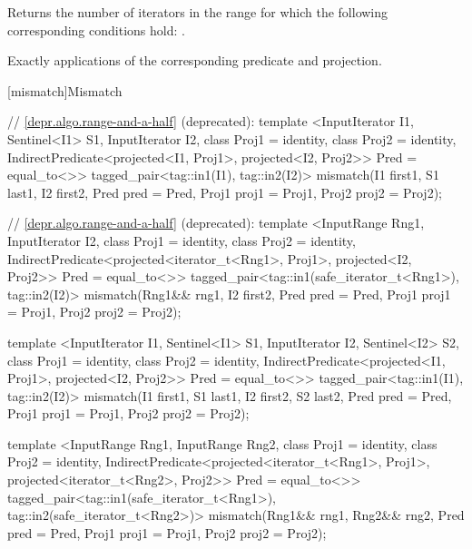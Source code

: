 \begin{itemdescr}
\pnum
\effects
Returns the number of iterators
in the range 
for which the following corresponding
conditions hold:
.

\pnum
\complexity
Exactly
applications of the corresponding predicate and projection.
\end{itemdescr}

[mismatch]{Mismatch}

%
\begin{itemdecl}
// \ref{depr.algo.range-and-a-half} (deprecated):
template <InputIterator I1, Sentinel<I1> S1, InputIterator I2,
    class Proj1 = identity, class Proj2 = identity,
    IndirectPredicate<projected<I1, Proj1>, projected<I2, Proj2>> Pred = equal_to<>>
  tagged_pair<tag::in1(I1), tag::in2(I2)>
    mismatch(I1 first1, S1 last1, I2 first2, Pred pred = Pred{},
             Proj1 proj1 = Proj1{}, Proj2 proj2 = Proj2{});

// \ref{depr.algo.range-and-a-half} (deprecated):
template <InputRange Rng1, InputIterator I2,
    class Proj1 = identity, class Proj2 = identity,
    IndirectPredicate<projected<iterator_t<Rng1>, Proj1>,
      projected<I2, Proj2>> Pred = equal_to<>>
  tagged_pair<tag::in1(safe_iterator_t<Rng1>), tag::in2(I2)>
    mismatch(Rng1&& rng1, I2 first2, Pred pred = Pred{},
             Proj1 proj1 = Proj1{}, Proj2 proj2 = Proj2{});

template <InputIterator I1, Sentinel<I1> S1, InputIterator I2, Sentinel<I2> S2,
    class Proj1 = identity, class Proj2 = identity,
    IndirectPredicate<projected<I1, Proj1>, projected<I2, Proj2>> Pred = equal_to<>>
  tagged_pair<tag::in1(I1), tag::in2(I2)>
    mismatch(I1 first1, S1 last1, I2 first2, S2 last2, Pred pred = Pred{},
             Proj1 proj1 = Proj1{}, Proj2 proj2 = Proj2{});

template <InputRange Rng1, InputRange Rng2,
    class Proj1 = identity, class Proj2 = identity,
    IndirectPredicate<projected<iterator_t<Rng1>, Proj1>,
      projected<iterator_t<Rng2>, Proj2>> Pred = equal_to<>>
  tagged_pair<tag::in1(safe_iterator_t<Rng1>), tag::in2(safe_iterator_t<Rng2>)>
    mismatch(Rng1&& rng1, Rng2&& rng2, Pred pred = Pred{},
             Proj1 proj1 = Proj1{}, Proj2 proj2 = Proj2{});
\end{itemdecl}

